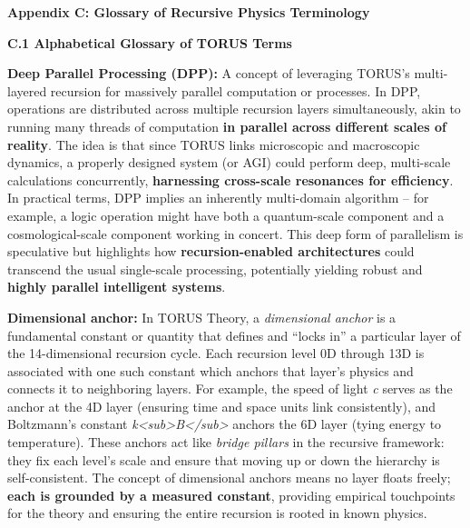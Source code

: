 \documentclass[
]{article}
\author{}
\date{}
\begin{document}
\textbf{Appendix C: Glossary of Recursive Physics Terminology}

\textbf{C.1 Alphabetical Glossary of TORUS Terms}

\textbf{Deep Parallel Processing (DPP):} A concept of leveraging TORUS's
multi-layered recursion for massively parallel computation or processes.
In DPP, operations are distributed across multiple recursion layers
simultaneously, akin to running many threads of computation \textbf{in
parallel across different scales of reality}. The idea is that since
TORUS links microscopic and macroscopic dynamics, a properly designed
system (or AGI) could perform deep, multi-scale calculations
concurrently, \textbf{harnessing cross-scale resonances for
efficiency}\hspace{0pt}. In practical terms, DPP implies an inherently
multi-domain algorithm -- for example, a logic operation might have both
a quantum-scale component and a cosmological-scale component working in
concert\hspace{0pt}. This deep form of parallelism is speculative but
highlights how \textbf{recursion-enabled architectures} could transcend
the usual single-scale processing, potentially yielding robust and
\textbf{highly parallel intelligent systems}.

\textbf{Dimensional anchor:} In TORUS Theory, a \emph{dimensional
anchor} is a fundamental constant or quantity that defines and ``locks
in'' a particular layer of the 14-dimensional recursion cycle. Each
recursion level 0D through 13D is associated with one such constant
which anchors that layer's physics and connects it to neighboring
layers\hspace{0pt}. For example, the speed of light \emph{c} serves as
the anchor at the 4D layer (ensuring time and space units link
consistently), and Boltzmann's constant
\emph{k\textless sub\textgreater B\textless/sub\textgreater{}} anchors
the 6D layer (tying energy to temperature)\hspace{0pt}. These anchors
act like \emph{bridge pillars} in the recursive framework: they fix each
level's scale and ensure that moving up or down the hierarchy is
self-consistent. The concept of dimensional anchors means no layer
floats freely; \textbf{each is grounded by a measured constant},
providing empirical touchpoints for the theory and ensuring the entire
recursion is rooted in known physics\hspace{0pt}.
\end{document}
